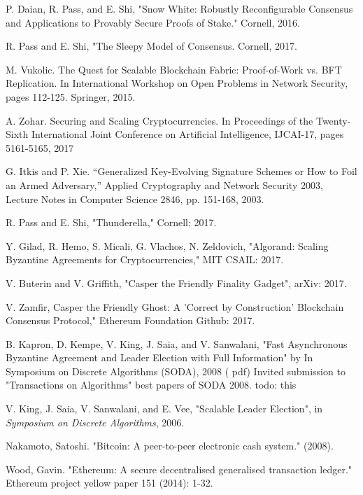 \documentclass[10pt,journal,compsoc]{IEEEtran}
\begin{document}
\begin{thebibliography}{1}
 P. Daian, R. Pass, and E. Shi, "Snow White: Robustly Reconfigurable Consensus and Applications to Provably Secure Proofs of Stake." Cornell, 2016.

 R. Pass and E. Shi, "The Sleepy Model of Consensus. Cornell, 2017.

 M. Vukolic. The Quest for Scalable Blockchain Fabric: Proof-of-Work vs. BFT Replication. In International Workshop on Open Problems in Network Security, pages 112-125. Springer, 2015.

 A. Zohar. Securing and Scaling Cryptocurrencies. In Proceedings of the Twenty-Sixth International Joint Conference on Artificial Intelligence, IJCAI-17, pages 5161-5165, 2017

 G. Itkis and P. Xie. “Generalized Key-Evolving Signature Schemes or How to Foil an Armed Adversary,” Applied Cryptography and Network Security 2003, Lecture Notes in Computer Science 2846, pp. 151-168, 2003.

 R. Pass and E. Shi, "Thunderella," Cornell: 2017.

Y. Gilad, R. Hemo, S. Micali, G. Vlachos, N. Zeldovich, "Algorand: Scaling Byzantine Agreements for Cryptocurrencies," MIT CSAIL: 2017.

V. Buterin and V. Griffith, "Casper the Friendly Finality Gadget", arXiv: 2017.

 V. Zamfir, Casper the Friendly Ghost: A 'Correct by Construction' Blockchain Consensus Protocol," Ethereum Foundation Github: 2017.

B. Kapron, D. Kempe, V. King, J. Saia, and V. Sanwalani, "Fast Asynchronous Byzantine Agreement and Leader Election with Full Information" by In Symposium on Discrete Algorithms (SODA), 2008 ( pdf) Invited submission to "Transactions on Algorithms" best papers of SODA 2008. todo: this

V. King, J. Saia, V. Sanwalani, and E. Vee, "Scalable Leader Election", in \emph{Symposium on Discrete Algorithms}, 2006.

Nakamoto, Satoshi. "Bitcoin: A peer-to-peer electronic cash system." (2008).

Wood, Gavin. "Ethereum: A secure decentralised generalised transaction ledger." Ethereum project yellow paper 151 (2014): 1-32.

\end{thebibliography}
\end{document}
